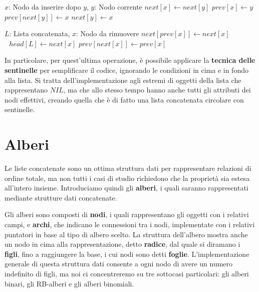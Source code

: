 \begin{algorithm}[h]
	\caption{list-insert(x, y)}
	\begin{algorithmic}
		\Require $x$: Nodo da inserire dopo $y$, $y$: Nodo corrente
		\State $next[x]\gets next[y]$
		\State $prev[x]\gets y$
			\State $prev[next[y]]\gets x$
		\EndIf
		\State $next[y]\gets x$
	\end{algorithmic}
\end{algorithm}

\begin{algorithm}[h]
	\caption{list-remove(L, x)}
	\begin{algorithmic}
		\Require $L$: Lista concatenata, $x$: Nodo da rimuovere
		\If{$prev[x]\neq NIL$}
			\State $next[prev[x]]\gets next[x]$
		\Else $\text{ }head[L]\gets next[x]$
		\EndIf
		\If{$next[x]\neq NIL$}
			\State $prev[next[x]]\gets prev[x]$
		\EndIf
	\end{algorithmic}
\end{algorithm}

\noindent In particolare, per quest'ultima operazione, è possibile applicare la \textbf{tecnica delle sentinelle} per semplificare il codice, ignorando
le condizioni in cima e in fondo alla lista. Si tratta dell'implementazione agli estremi di oggetti della lista che rappresentano $NIL$, ma che allo
stesso tempo hanno anche tutti gli attributi dei nodi effettivi, creando quella che è di fatto una lista concatenata circolare con sentinelle.\newpage

%

\section{Alberi}
Le liste concatenate sono un ottima struttura dati per rappresentare relazioni di ordine totale, ma non tutti i casi di studio richiedono che la
proprietà sia estesa all'intero insieme. Introduciamo quindi gli \textbf{alberi}, i quali saranno rappresentati mediante strutture dati concatenate.\par
Gli alberi sono composti di \textbf{nodi}, i quali rappresentano gli oggetti con i relativi campi, e \textbf{archi}, che indicano le connessioni tra i
nodi, implementate con i relativi puntatori in base al tipo di albero scelto. La struttura dell'albero mostra anche un nodo in cima alla rappresentazione,
detto \textbf{radice}, dal quale si diramano i \textbf{figli}, fino a raggiungere la base, i cui nodi sono detti \textbf{foglie}. L'implementazione
generale di questa struttura dati consente a ogni nodo di avere un numero indefinito di figli, ma noi ci concentreremo su tre sottocasi particolari: gli
alberi binari, gli RB-alberi e gli alberi binomiali.


